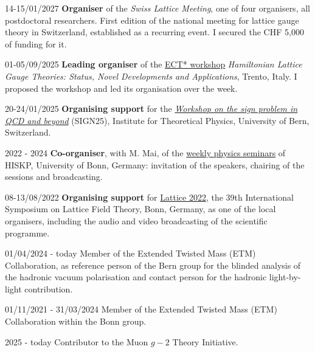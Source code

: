 \begin{cvlist}
\item[14-15/01/2027] \textbf{Organiser} of the \textit{Swiss Lattice Meeting}, one of four organisers, all
postdoctoral researchers. First edition of the national meeting for lattice gauge theory in Switzerland,
established as a recurring event. I secured the CHF 5{,}000 of funding for it.

\item[01-05/09/2025] \textbf{Leading organiser} of the \href{https://indico.ectstar.eu/event/242/}{ECT*
workshop} \textit{Hamiltonian Lattice Gauge Theories: Status, Novel Developments and Applications}, Trento, Italy.
I proposed the workshop and led its organisation over the week.

\item[20-24/01/2025] \textbf{Organising support} for the
\href{https://indico.global/event/9559/}{\textit{Workshop on the sign problem in QCD and beyond}} (SIGN25),
Institute for Theoretical Physics, University of Bern, Switzerland.

\item[2022 - 2024] \textbf{Co-organiser}, with M. Mai, of the
\href{https://indico.hiskp.uni-bonn.de/category/35/}{weekly physics seminars} of HISKP, University of Bonn, Germany:
invitation of the speakers, chairing of the sessions and broadcasting.

\item[08-13/08/2022] \textbf{Organising support} for
\href{https://indico.hiskp.uni-bonn.de/event/40/}{Lattice 2022}, the 39th International Symposium on Lattice
Field Theory, Bonn, Germany, as one of the local organisers, including the audio and video broadcasting of the
scientific programme.
\end{cvlist}


\begin{cvlist}
\item[01/04/2024 - today] Member of the Extended Twisted Mass (ETM) Collaboration, as reference person of the
Bern group for the blinded analysis of the hadronic vacuum polarisation and contact person for the hadronic
light-by-light contribution.
\item[01/11/2021 - 31/03/2024] Member of the Extended Twisted Mass (ETM) Collaboration within the Bonn group.
\item[2025 - today] Contributor to the Muon $g-2$ Theory Initiative.
\end{cvlist}

